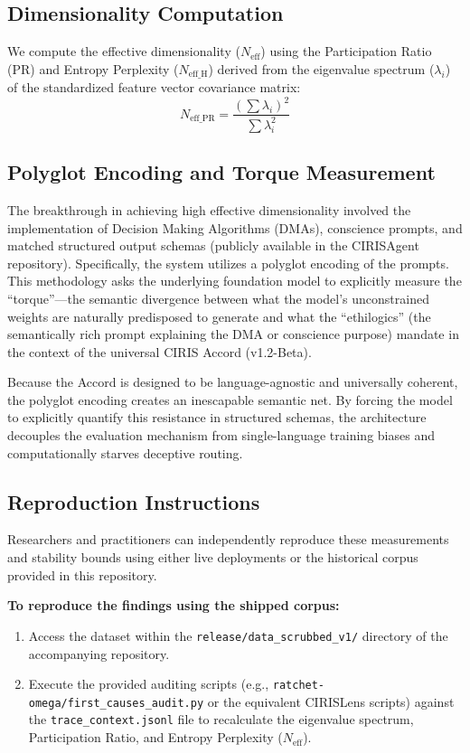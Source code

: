 \documentclass[11pt,a4paper]{article}
\begin{document}
\subsection{Dimensionality Computation}
We compute the effective dimensionality ($N_{\text{eff}}$) using the Participation Ratio (PR) and Entropy Perplexity ($N_{\text{eff\_H}}$) derived from the eigenvalue spectrum ($\lambda_i$) of the standardized feature vector covariance matrix:
\begin{equation}
N_{\text{eff\_PR}} = \frac{(\sum \lambda_i)^2}{\sum \lambda_i^2}
\end{equation}

\subsection{Polyglot Encoding and Torque Measurement}
The breakthrough in achieving high effective dimensionality involved the implementation of Decision Making Algorithms (DMAs), conscience prompts, and matched structured output schemas (publicly available in the CIRISAgent repository). Specifically, the system utilizes a polyglot encoding of the prompts. This methodology asks the underlying foundation model to explicitly measure the ``torque''---the semantic divergence between what the model's unconstrained weights are naturally predisposed to generate and what the ``ethilogics'' (the semantically rich prompt explaining the DMA or conscience purpose) mandate in the context of the universal CIRIS Accord (v1.2-Beta). 

Because the Accord is designed to be language-agnostic and universally coherent, the polyglot encoding creates an inescapable semantic net. By forcing the model to explicitly quantify this resistance in structured schemas, the architecture decouples the evaluation mechanism from single-language training biases and computationally starves deceptive routing.

\subsection{Reproduction Instructions}
Researchers and practitioners can independently reproduce these measurements and stability bounds using either live deployments or the historical corpus provided in this repository.

\textbf{To reproduce the findings using the shipped corpus:}
\begin{enumerate}
    \item Access the dataset within the \texttt{release/data\_scrubbed\_v1/} directory of the accompanying repository.
    \item Execute the provided auditing scripts (e.g., \texttt{ratchet-omega/first\_causes\_audit.py} or the equivalent CIRISLens scripts) against the \texttt{trace\_context.jsonl} file to recalculate the eigenvalue spectrum, Participation Ratio, and Entropy Perplexity ($N_{\text{eff}}$).
\end{enumerate}
\end{document}
